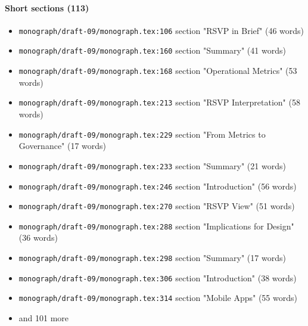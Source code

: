 \documentclass[11pt]{article}
\newcommand{\loc}[1]{{\small\color{muted}\texttt{#1}}}
\begin{document}
\paragraph{Short sections (113)}
\begin{itemize}
\item \loc{monograph/\allowbreak{}draft-09/\allowbreak{}monograph.tex:106} section "RSVP in Brief" (46 words)
\item \loc{monograph/\allowbreak{}draft-09/\allowbreak{}monograph.tex:160} section "Summary" (41 words)
\item \loc{monograph/\allowbreak{}draft-09/\allowbreak{}monograph.tex:168} section "Operational Metrics" (53 words)
\item \loc{monograph/\allowbreak{}draft-09/\allowbreak{}monograph.tex:213} section "RSVP Interpretation" (58 words)
\item \loc{monograph/\allowbreak{}draft-09/\allowbreak{}monograph.tex:229} section "From Metrics to Governance" (17 words)
\item \loc{monograph/\allowbreak{}draft-09/\allowbreak{}monograph.tex:233} section "Summary" (21 words)
\item \loc{monograph/\allowbreak{}draft-09/\allowbreak{}monograph.tex:246} section "Introduction" (56 words)
\item \loc{monograph/\allowbreak{}draft-09/\allowbreak{}monograph.tex:270} section "RSVP View" (51 words)
\item \loc{monograph/\allowbreak{}draft-09/\allowbreak{}monograph.tex:288} section "Implications for Design" (36 words)
\item \loc{monograph/\allowbreak{}draft-09/\allowbreak{}monograph.tex:298} section "Summary" (17 words)
\item \loc{monograph/\allowbreak{}draft-09/\allowbreak{}monograph.tex:306} section "Introduction" (38 words)
\item \loc{monograph/\allowbreak{}draft-09/\allowbreak{}monograph.tex:314} section "Mobile Apps" (55 words)
\item[] {\color{muted}\small and 101 more}
\end{itemize}
\end{document}
